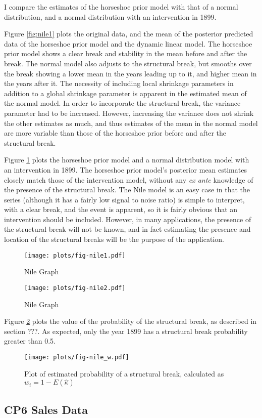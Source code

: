 \documentclass{article}
\begin{document}
I compare the estimates of the horseshoe prior model with that of a normal distribution, and a normal distribution with an intervention in 1899.

Figure \ref{fig:nile1} plots the original data, and the mean of the posterior predicted data of the horseshoe prior model and the dynamic linear model.
The horseshoe prior model shows a clear break and stability in the mean before and after the break.
The normal model also adjusts to the structural break, but smooths over the break showing a lower mean in the years leading up to it, and higher mean in the years after it.
The necessity of including local shrinkage parameters in addition to a global shrinkage parameter is apparent in the estimated mean of the normal model.
In order to incorporate the structural break, the variance parameter had to be increased.
However, increasing the variance does not shrink the other estimates as much, and thus estimates of the mean in the normal model are more variable than those of the horseshoe prior before and after the structural break.

Figure \ref{fig:nile2} plots the horseshoe prior model and a normal distribution model with an intervention in 1899.
The horseshoe prior model's posterior mean estimates closely match those of the intervention model, without any \textit{ex ante} knowledge of the presence of the structural break.
The Nile model is an easy case in that the series (although it has a fairly low signal to  noise ratio) is simple to interpret, with a clear break, and the event is apparent, so it is fairly obvious that an intervention should be included.
However, in many applications, the presence of the structural break will not be known, and in fact estimating the presence and location of the structural breaks will be the purpose of the application.

\begin{figure}[htpb]
  \centering
  \texttt{[image: plots/fig-nile1.pdf]}  
  \caption{Nile Graph}
  \label{fig:nile1}

  \texttt{[image: plots/fig-nile2.pdf]}
  \caption{Nile Graph}
  \label{fig:nile2}
\end{figure}

Figure \ref{fig:nile_w} plots the value of the probability of the structural break, as described in section ???.
As expected, only the year 1899 has a structural break probability greater than 0.5.

\begin{figure}[htpb]
  \centering
  \texttt{[image: plots/fig-nile\_w.pdf]}
  \caption{Plot of estimated probability of a structural break, calculated as $w_{i} = 1 - E(\hat{\kappa})$}
  \label{fig:nile_w}
\end{figure}



\subsection{CP6 Sales Data}
\label{sec:cp6-sales-data}




\printbibliography{}
\end{document}
